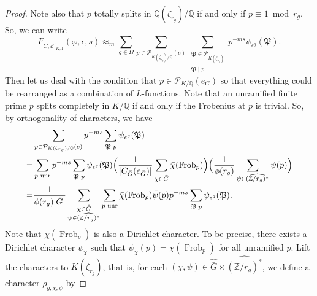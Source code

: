\documentclass{amsart}
\numberwithin{equation}{section}
\theoremstyle{plain}
\theoremstyle{definition}
\theoremstyle{remark}
\begin{document}
\begin{proof}
    Note also that $p$ totally splits in $\mathbb{Q}(\zeta_{r_g})/\mathbb{Q}$ if and only if $p\equiv1\bmod{r_g}$.
    So, we can write 
    \begin{equation*}
        F_{C,\tilde{\mathcal{E}}'_{K,1}}(\varphi,\epsilon,s)\approx_m
        \sum_{g\in\Omega}
            \sum_{p\in\mathcal{P}_{K(\zeta_{r_g})/\mathbb{Q}}(e)}
            \sum_{
                \substack{
                    \mathfrak{P}\in\mathcal{P}_{K(\zeta_{r_g})}\\
                    \mathfrak{P}\mid p
                }
            }p^{-ms}\psi_{\epsilon^g}(\mathfrak{P}).
    \end{equation*}
    Then let us deal with the condition that $p\in\mathcal{P}_{K/\mathbb{Q}}(e_G)$ so that everything could be rearranged as a combination of $L$-functions.
    Note that an unramified finite prime $p$ splits completely in $K/\mathbb{Q}$ if and only if the Frobenius at $p$ is trivial.
    So, by orthogonality of characters, we have
    \begin{equation*}
        \begin{aligned}
            &\sum_{p\in\mathcal{P}_{K(\zeta_{r_g})/\mathbb{Q}}(e)}p^{-ms}\sum_{\mathfrak{P}\mid p}\psi_{\epsilon^g}(\mathfrak{P})
            \\
            =&\sum_{p\text{ unr}}p^{-ms}\sum_{\mathfrak{P}\mid p}\psi_{\epsilon^g}(\mathfrak{P})
            \Bigl(
            \frac{1}{\lvert C_{\bar{G}}(e_{\bar{G}})\rvert}\sum_{\chi\in\hat{\bar{G}}}\bar{\chi}(\operatorname{Frob}_p)
            \Bigr)
            \Bigl(
            \frac{1}{\phi(r_g)}\sum_{\psi\in\widehat{(\mathbb{Z}/r_g)^*}}\bar{\psi}(p)
            \Bigr)
            \\
            =&\frac{1}{\phi(r_g)\lvert \bar{G}\rvert}
            \sum_{
                \substack{
                    \chi\in\hat{\bar{G}}\\
                    \psi\in\widehat{(\mathbb{Z}/r_g)^*}
                }
            }
            \sum_{p\text{ unr}}
            \bar{\chi}(\operatorname{Frob}_p)\bar{\psi}(p)p^{-ms}\sum_{\mathfrak{P}\mid p}\psi_{\epsilon^g}(\mathfrak{P}).
        \end{aligned}
    \end{equation*}
    Note that $\bar{\chi}(\operatorname{Frob}_p)$ is also a Dirichlet character.
    To be precise, there exists a Dirichlet character $\psi_{\chi}$ such that $\psi_{\chi}(p)=\chi(\operatorname{Frob}_p)$ for all unramified $p$.
    Lift the characters to $K(\zeta_{r_g})$, that is, for each $(\chi,\psi)\in\widehat{\bar{G}}\times\widehat{(\mathbb{Z}/r_g)^*}$, we define a character $\rho_{g,\chi,\psi}$ by 

\end{proof}
\end{document}
